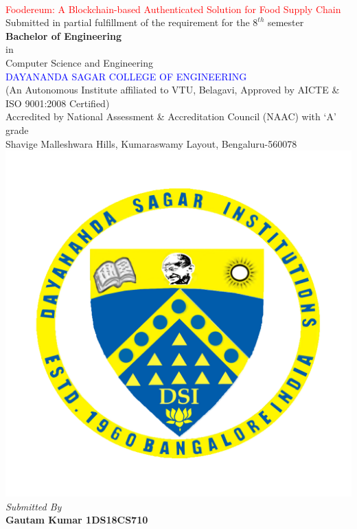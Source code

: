 \documentclass[12pt,a4paper,twocolumn,fleqn]{article}
\begin{document}
\pagestyle{empty}
\onecolumn
\begin{center}
 \\
\smallskip
\textcolor{red}{\LARGE{Foodereum: A Blockchain-based Authenticated Solution for Food Supply Chain}} \\
\large{Submitted in partial fulfillment of the requirement for the $8^{th}$ semester} \\
\large{\textbf{Bachelor of Engineering}} \\
\large{in} \\
\large{Computer Science and Engineering} \\
\textcolor{blue}{\LARGE{DAYANANDA SAGAR COLLEGE OF ENGINEERING}} \\
\footnotesize{(An Autonomous Institute affiliated to VTU, Belagavi, Approved by AICTE \& ISO 9001:2008 Certified)} \\
\footnotesize{Accredited by National Assessment \& Accreditation Council (NAAC) with ‘A’ grade}  \\
\footnotesize{Shavige Malleshwara Hills, Kumaraswamy Layout, Bengaluru-560078} \\
\includegraphics[scale=0.4]{media/DSCE-min.png} \\
\textit{Submitted By} \\
\textbf{Gautam Kumar \space 1DS18CS710} \\

\end{center}
\end{document}
